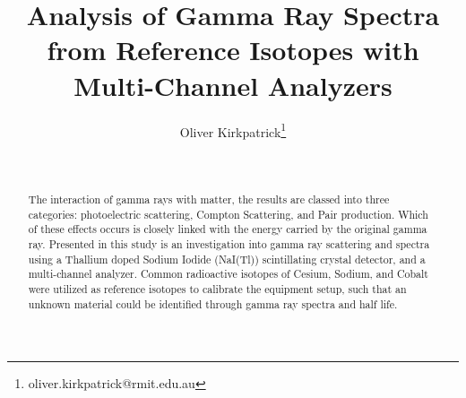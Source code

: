 \documentclass[a4paper,twocolumn]{IEEEtran}
\author{Oliver Kirkpatrick\footnote{oliver.kirkpatrick@rmit.edu.au}}
\begin{document}
    \title{Analysis of Gamma Ray Spectra from Reference Isotopes with Multi-Channel Analyzers}
    \author{
    \\
    }

    \maketitle
    \begin{abstract}
        The interaction of gamma rays with matter, the results are classed into three categories: photoelectric scattering, Compton Scattering, and Pair production. Which of these effects occurs is closely linked with the energy carried by the original gamma ray. Presented in this study is an investigation into gamma ray scattering and spectra using a Thallium doped Sodium Iodide (NaI(Tl)) scintillating crystal detector, and a multi-channel analyzer. Common radioactive isotopes of Cesium, Sodium, and Cobalt were utilized as reference isotopes to calibrate the equipment setup, such that an unknown material could be identified through gamma ray spectra and half life.
    \end{abstract}
\end{document}
